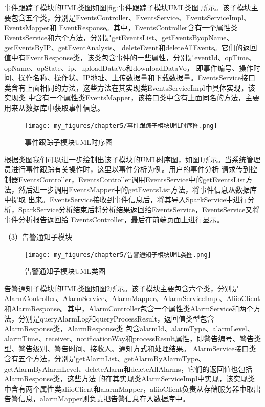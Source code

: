 事件跟踪子模块的UML类图如图\ref{fig:事件跟踪子模块UML类图}所示。该子模块主要包含五个类，分别是EventsController、EventsService、EventsServiceImpl、EventsMapper和
EventResponse。其中，EventsController含有一个属性类EventsService和六个方法，分别是getEventsList、getEventsByopName、getEventsByIP、getEventAnalysis、
deleteEvent和deleteAllEvents。它们的返回值中有EventResponse类，该类包含事件的一些属性，分别是eventId、opTime、opName、opState、ip、uploadDataVo和downloadDataVo，
即事件编号、操作时间、操作名称、操作状、IP地址、上传数据量和下载数据量。EventsService接口类含有上面相同的方法，这些方法在其实现类EventsServiceImpl中具体实现，该实现类
中含有一个属性类EventsMapper，该接口类中含有上面同名的方法，主要用来从数据库中获取事件信息。

\begin{figure}[htb]
    \centering
    \texttt{[image: my\_figures/chapter5/事件跟踪子模块UML时序图.png]}
    \caption{事件跟踪子模块UML时序图}
    \label{fig:事件跟踪子模块UML时序图}
\end{figure}

根据类图我们可以进一步绘制出该子模块的UML时序图，如图\ref{fig:事件跟踪子模块UML时序图}所示。当系统管理员进行事件跟踪有关操作时，这里以事件分析为例。用户的事件分析
请求传到控制器EventsController，EventsController调用EventsService中的getEventsList方法，然后进一步调用EventsMapper中的getEventsList方法，将事件信息从数据库中提取
出来。EventsService接收到事件信息后，将其导入SparkService中进行分析，SparkService分析结束后将分析结果返回给EventsService，EventsService又将事件分析报告返回给
EventsController，最后在前端页面上进行显示。

（3）告警通知子模块

\begin{figure}[htb]
    \centering
    \texttt{[image: my\_figures/chapter5/告警通知子模块UML类图.png]}
    \caption{告警通知子模块UML类图}
    \label{fig:告警通知子模块UML类图}
\end{figure}

告警通知子模块的UML类图如图\ref{fig:告警通知子模块UML类图}所示。该子模块主要包含六个类，分别是AlarmController、AlarmService、AlarmMapper、AlarmServiceImpl、AliioClient
和AlarmResponse。其中，AlarmController包含一个属性类AlarmService和两个方法，分别是queryAlarmLog和queryProcessResult，返回值类型包含AlarmResponse类，AlarmResponse类
包含alarmId、alarmType、alarmLevel、alarmTime、receiver、notificationWay和processResult属性，即警告编号、警告类型、警告级别、警告时间、接收人、通知方式和处理结果。
AlarmService接口类含有五个方法，分别是getAlarmList、getAlarmByAlarmType、getAlarmByAlarmLevel、deleteAlarm和deleteAllAlarms，它们的返回值也包括AlarmResponse类，这些方法
的在其实现类AlarmServiceImpl中实现，该实现类中含有两个属性类aliioClient和alarmMapper，aliioClient负责从存储服务器中取出告警信息，alarmMapper则负责把告警信息存入数据库中。

